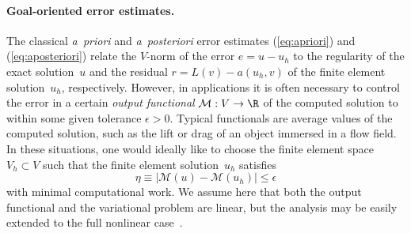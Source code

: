 \paragraph{Goal-oriented error estimates.}

The classical \emph{a~priori} and \emph{a~posteriori} error estimates
(\ref{eq:apriori}) and (\ref{eq:aposteriori}) relate the $V$-norm of
the error $e = u - u_h$ to the regularity of the exact solution~$u$
and the residual $r = L(v) - a(u_h, v)$ of the finite element
solution~$u_h$, respectively. However, in applications it is often
necessary to control the error in a certain \emph{output functional}
$\mathcal{M} : V \rightarrow \R$ of the computed solution to within
some given tolerance $\epsilon > 0$. Typical functionals are average
values of the computed solution, such as the lift or drag of an object
immersed in a flow field. In these situations, one would ideally like
to choose the finite element space $V_h \subset V$ such that the
finite element solution~$u_h$ satisfies
\begin{equation}
  \eta \equiv |\mathcal{M}(u) - \mathcal{M}(u_h)| \leqslant \epsilon
\end{equation}
with minimal computational work. We assume here that both the output
functional and the variational problem are linear, but the analysis
may be easily extended to the full nonlinear
case~\citep{ErikssonEstepHansboEtAl1995,BeckerRannacher2001}.

